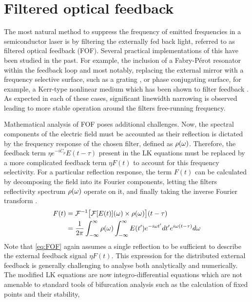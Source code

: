 \section*{Filtered optical feedback}
\label{sec:FOF}
%
The most natural method to suppress the frequency of emitted frequencies in a semiconductor laser is by filtering the externally fed back light, referred to as filtered optical feedback (FOF). 
Several practical implementations of this have been studied in the past. 
For example, the inclusion of a Fabry-P\'erot resonator within the feedback loop \cite{detienne1997semiconductor} and most notably, replacing the external mirror with a frequency selective surface, 
such as a grating \cite{dahmani1987frequency, harvey1991external, jin1996single}, or phase conjugating surface, for example, a Kerr-type nonlinear medium which has been shown to filter feedback \cite{agrawal1984line}. 
As expected in each of these cases, significant linewidth narrowing is observed leading to more stable operation around the filters free-running frequency. 
%
\par
%
Mathematical analysis of FOF poses additional challenges. 
Now, the spectral components of the electric field must be accounted as their reflection is dictated by the frequency response of the chosen filter, defined as $\rho(\omega)$. 
Therefore, the feedback term $\eta e^{-i C_p} E(t-\tau)$ present in the LK equations must be replaced by a more complicated feedback term $\eta F(t)$ to account for this frequency selectivity. 
For a particular reflection response, the term $F(t)$ can be calculated by decomposing the field into its Fourier components, 
letting the filters reflectivity spectrum $\rho(\omega)$ operate on it, and finally taking the inverse Fourier transform \cite{yousefi1999dynamical}.
%
\begin{equation}
    \begin{aligned}
    \label{eq:FOF}
         F(t) &=  \mathcal{F}^{-1}\big[ \mathcal{F}[E(t)](\omega) \times \rho(\omega) \big](t-\tau)\\
              &= \frac{1}{2\pi} \int_{-\infty}^{\infty} \rho(\omega) \int_{-\infty}^{\infty} E(t') e^{-i \omega t'} dt' e^{i \omega (t-\tau)} d\omega
    \end{aligned}
\end{equation}
%
Note that \eqref{eq:FOF} again assumes a single reflection to be sufficient to describe the external feedback signal $\eta F(t)$. 
This expression for the distributed external feedback is generally challenging to analyse both analytically and numerically. 
The modified LK equations are now integro-differential equations which are not amenable to standard tools of bifurcation analysis such as the calculation of fixed points and their stability, 
